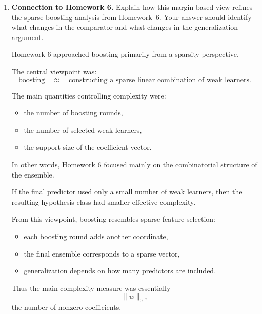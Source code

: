 \documentclass[11pt]{article}
\begin{document}
\begin{enumerate}
\begin{solutionbox}
This equivalence is one of the central theoretical foundations of modern boosting theory.

\medskip

\textbf{Lean formalization artifact.}

A supporting Lean 4 artifact formalizing the matrix/minimax relationship is included in
\[
\texttt{src/lean/Assignment7\_C3\_MarginEdge.lean}.
\]

\end{solutionbox}

\item \textbf{Connection to Homework 6.}
Explain how this margin-based view refines the sparse-boosting analysis from Homework~6. 
Your answer should identify what changes in the comparator and what changes in the 
generalization argument.
\begin{solutionbox}

Homework 6 approached boosting primarily from a sparsity perspective.

The central viewpoint was:
\[
\text{boosting}
\quad\approx\quad
\text{constructing a sparse linear combination of weak learners}.
\]

The main quantities controlling complexity were:
\begin{itemize}
    \item the number of boosting rounds,
    \item the number of selected weak learners,
    \item the support size of the coefficient vector.
\end{itemize}

In other words, Homework 6 focused mainly on the combinatorial structure of the ensemble.

If the final predictor used only a small number of weak learners, then the resulting hypothesis class had smaller effective complexity.

From this viewpoint, boosting resembles sparse feature selection:
\begin{itemize}
    \item each boosting round adds another coordinate,
    \item the final ensemble corresponds to a sparse vector,
    \item generalization depends on how many predictors are included.
\end{itemize}

Thus the main complexity measure was essentially
\[
\|w\|_0,
\]
the number of nonzero coefficients.


\end{solutionbox}
\end{enumerate}
\end{document}

